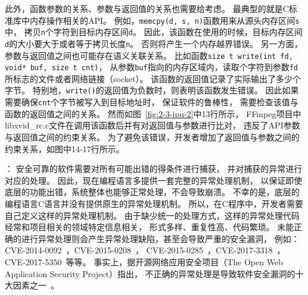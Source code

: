 
此外，函数参数的关系、参数与返回值的关系也需要给考虑。
最典型的就是C标准库中内存操作相关的API。
例如，\texttt{memcpy(d, s, n)}函数用来从源头内存区间\texttt{s}中，
拷贝\texttt{n}个字符到目标内存区间\texttt{d}。
因此，该函数在使用的时候，目标内存区间\texttt{d}的大小要大于或者等于拷贝长度\texttt{n}。
否则将产生一个内存越界错误。
另一方面，参数与返回值之间也可能存在语义关联关系。
比如函数\texttt{size t write(int fd, void* buf, size t cnt)}，
从参数\texttt{buf}指向的内存区域内，读取个字符到参数\texttt{fd}所标志的文件或者网络链接（socket）。
该函数的返回值记录了实际输出了多少个字节。
特别地，\texttt{write()}的返回值为负数时，则表明该函数发生错误。
因此如果需要确保\texttt{cnt}个字节被写入到目标地址时，
保证软件的鲁棒性，
需要检查该值与函数的返回值之间的关系。
然而如图~\ref{fig:2-3-ipu-2}中13行所示，
FFmpeg项目中libxvid\_rc.c文件在调用该函数后并有对返回值与参数进行比对，
违反了API参数与返回值之间的约束关系。
为了避免该错误，开发者增加了返回值与参数之间的约束关系，如图中14-17行所示。

\vspace*{10pt}
\begin{center}
	\noindent{}
\end{center}

\vspace*{10pt}
：
安全可靠的软件需要对所有可能出错的得条件进行捕获，
并对捕获的异常进行对应的处理。
因此，现在编程语言多提供一套完整的异常处理机制，
以保证即使底层的功能出错，系统整体也能够正常处理，不会导致崩溃。
不幸的是，底层的编程语言C语言并没有提供原生的异常处理机制。
所以，在C程序中，开发者需要自己定义这样的异常处理机制。
由于缺少统一的处理方式，这样的异常处理代码经常和项目相关的领域特定信息相关，
形式多样、重复性高、代码繁琐。
未能正确的进行异常处理则会产生异常处理缺陷，甚至会导致严重的安全漏洞，
例如：CVE-2014-0092~\cite{CVE-2014-0092}，CVE-2015-0208~\cite{CVE-2015-0208}，
CVE-2015-0285~\cite{CVE-2015-0285}，CVE-2017-3318~\cite{CVE-2017-3318}，
CVE-2017-5350~\cite{CVE-2017-5350}等等。
事实上，据开源网络应用安全项目（The Open Web Application Security Project）指出，
不正确的异常处理是导致软件安全漏洞的十大因素之一~\cite{07-owasp}。

